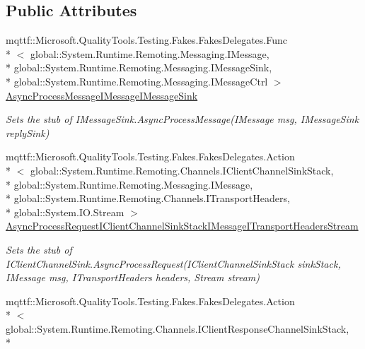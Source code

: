 \subsection*{Public Attributes}
\begin{DoxyCompactItemize}
\item 
mqttf\-::\-Microsoft.\-Quality\-Tools.\-Testing.\-Fakes.\-Fakes\-Delegates.\-Func\\*
$<$ global\-::\-System.\-Runtime.\-Remoting.\-Messaging.\-I\-Message, \\*
global\-::\-System.\-Runtime.\-Remoting.\-Messaging.\-I\-Message\-Sink, \\*
global\-::\-System.\-Runtime.\-Remoting.\-Messaging.\-I\-Message\-Ctrl $>$ \hyperlink{class_system_1_1_runtime_1_1_remoting_1_1_channels_1_1_fakes_1_1_stub_i_client_formatter_sink_a2b6127dacce8501f6bfc71ba7248d0bf}{Async\-Process\-Message\-I\-Message\-I\-Message\-Sink}
\begin{DoxyCompactList}\small\item\em Sets the stub of I\-Message\-Sink.\-Async\-Process\-Message(\-I\-Message msg, I\-Message\-Sink reply\-Sink)\end{DoxyCompactList}\item 
mqttf\-::\-Microsoft.\-Quality\-Tools.\-Testing.\-Fakes.\-Fakes\-Delegates.\-Action\\*
$<$ global\-::\-System.\-Runtime.\-Remoting.\-Channels.\-I\-Client\-Channel\-Sink\-Stack, \\*
global\-::\-System.\-Runtime.\-Remoting.\-Messaging.\-I\-Message, \\*
global\-::\-System.\-Runtime.\-Remoting.\-Channels.\-I\-Transport\-Headers, \\*
global\-::\-System.\-I\-O.\-Stream $>$ \hyperlink{class_system_1_1_runtime_1_1_remoting_1_1_channels_1_1_fakes_1_1_stub_i_client_formatter_sink_a641fc52e0a9078c857d8ec050328423d}{Async\-Process\-Request\-I\-Client\-Channel\-Sink\-Stack\-I\-Message\-I\-Transport\-Headers\-Stream}
\begin{DoxyCompactList}\small\item\em Sets the stub of I\-Client\-Channel\-Sink.\-Async\-Process\-Request(\-I\-Client\-Channel\-Sink\-Stack sink\-Stack, I\-Message msg, I\-Transport\-Headers headers, Stream stream)\end{DoxyCompactList}\item 
mqttf\-::\-Microsoft.\-Quality\-Tools.\-Testing.\-Fakes.\-Fakes\-Delegates.\-Action\\*
$<$ global\-::\-System.\-Runtime.\-Remoting.\-Channels.\-I\-Client\-Response\-Channel\-Sink\-Stack, \\*

\end{DoxyCompactItemize}

